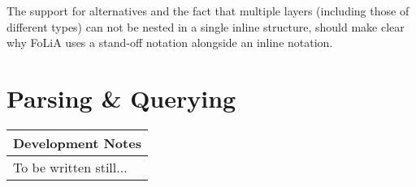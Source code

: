 \documentclass[a4paper,12pt]{report}
\newenvironment{devnotes}
{\newpage
\begin{center}
    \begin{tabular}[h!]{|p{0.8\textwidth}|}
    \hline
    {\bf Development Notes}\\\hline}
{   \\\hline
    \end{tabular}
\end{center}}
\begin{document}
The support for alternatives and the fact that multiple layers (including those of different types) can not be nested in a single inline structure, should make clear why FoLiA uses a stand-off notation alongside an inline notation. 


\chapter{Parsing \& Querying}

\begin{devnotes}
To be written still...
\end{devnotes}
\end{document}
